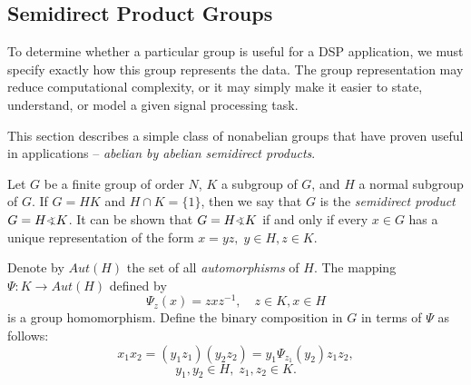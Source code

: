 

\subsection{Semidirect Product Groups}
To determine whether a particular group is useful for a DSP
application, we must specify exactly how this group
represents the data.
The group representation may reduce computational
complexity, or it may simply make it easier to state,
understand, or model a given signal processing task.

This section describes %
a simple class of nonabelian groups that have
proven useful in applications -- 
\emph{abelian by abelian semidirect products}. 


Let $G$ be a finite group of order $N$, $K$ a subgroup of $G$,
and $H$ a normal subgroup of $G$. If $G = HK$ and $H \cap
K = \{1\}$, then we say that $G$ is the 
\emph{semidirect product} $G = H \sdp K$. 
It can be shown that $G = H \sdp K$ if and only if every $x \in
G$ has a unique representation of the form $x = yz, \; y\in H,
z\in K$.

Denote by $Aut(H)$ the set of all \emph{automorphisms} of
$H$. The mapping $\Psi:K\rightarrow Aut(H)$ defined by  
\begin{equation}\label{eq:homo}
\Psi_z(x) = zxz^{-1}, \quad z\in K, x\in H
\end{equation}
is a group homomorphism. 
Define the binary composition in $G$
in terms of $\Psi$ as follows:
\begin{equation}\label{eq:PsiProd}
x_1x_2 = (y_1z_1)(y_2z_2)= y_1\Psi_{z_1}(y_2)z_1z_2,
\end{equation}
\[
y_1, y_2 \in H,\; z_1, z_2 \in K. 
\]

